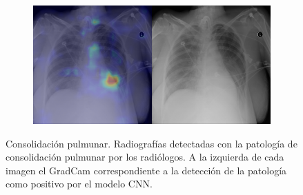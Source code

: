 \begin{figure}[b]
\begin{subfigure}{0.4\textwidth}
    \end{subfigure}
    \begin{subfigure}{0.4\textwidth}
        \centering
        \includegraphics[width=1.0\textwidth]{Chapters/5. Conclusiones/img/Consolidation/1_1_00018187_052.png}
    \end{subfigure}

    \caption[short]{Consolidación pulmunar. Radiografías detectadas con la patología de consolidación pulmunar por los
                    radiólogos. A la izquierda de cada imagen el GradCam correspondiente a la detección
                    de la patología como positivo por el modelo CNN.}
\end{figure}

